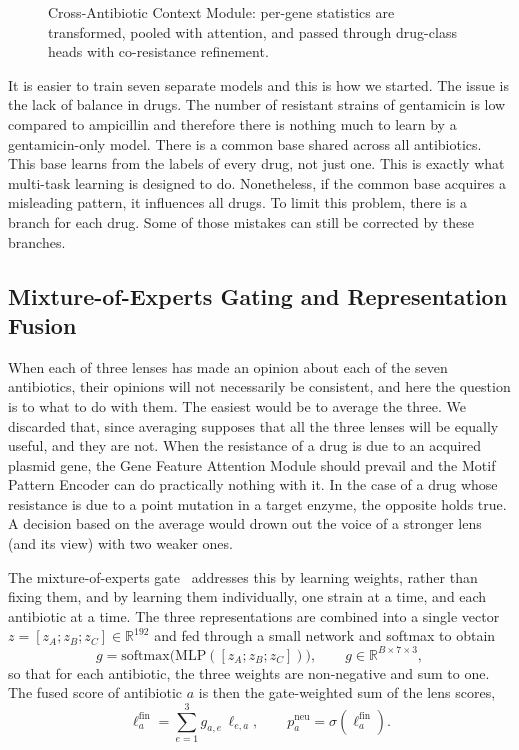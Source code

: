 \begin{figure}[H]
  \centering
  \resizebox{\textwidth}{!}{}
  \caption{Cross-Antibiotic Context Module: per-gene statistics are transformed, pooled with attention, and passed through drug-class heads with co-resistance refinement.}
  \label{fig:expertC}
\end{figure}

It is easier to train seven separate models and this is how we started. The issue is the lack
of balance in drugs. The number of resistant strains of gentamicin is low compared to
ampicillin and therefore there is nothing much to learn by a gentamicin-only model. There is a common base shared across all antibiotics. This base learns from the labels of
every drug, not just one. This is exactly what multi-task learning is designed to do.
Nonetheless, if the common base acquires a misleading pattern, it influences all drugs. To
limit this problem, there is a branch for each drug. Some of those mistakes can still be
corrected by these branches.

\FloatBarrier
\subsection{Mixture-of-Experts Gating and Representation Fusion}
\label{subsec:moegate}

When each of three lenses has made an opinion about each of the seven antibiotics, their
opinions will not necessarily be consistent, and here the question is to what to do with
them. The easiest would be to average the three. We discarded that, since averaging supposes
that all the three lenses will be equally useful, and they are not. When the resistance of a
drug is due to an acquired plasmid gene, the Gene Feature Attention Module should prevail and
the Motif Pattern Encoder can do practically nothing with it. In the case of a drug whose
resistance is due to a point mutation in a target enzyme, the opposite holds true. A decision based on the
average would drown out the voice of a stronger lens (and its view) with two weaker ones.

The mixture-of-experts gate~\cite{jacobs1991moe, shazeer2017moe} addresses this by learning
weights, rather than fixing them, and by learning them individually, one strain at a time, and
each antibiotic at a time. The three representations are combined into a single vector
$z = [z_A; z_B; z_C] \in \mathbb{R}^{192}$ and fed through a small network and softmax to
obtain
\begin{equation}
g = \mathrm{softmax}\big(\mathrm{MLP}([z_A; z_B; z_C])\big), \qquad g \in \mathbb{R}^{B \times 7 \times 3},
\label{eq:moe_gate}
\end{equation}
so that for each antibiotic, the three weights are non-negative and sum to one. The fused
score of antibiotic $a$ is then the gate-weighted sum of the lens scores,
\begin{equation}
\ell^{\mathrm{fin}}_{a} = \sum_{e=1}^{3} g_{a,e}\,\ell_{e,a},
\qquad
p^{\mathrm{neu}}_{a} = \sigma\!\left(\ell^{\mathrm{fin}}_{a}\right).
\label{eq:fusion}
\end{equation}

